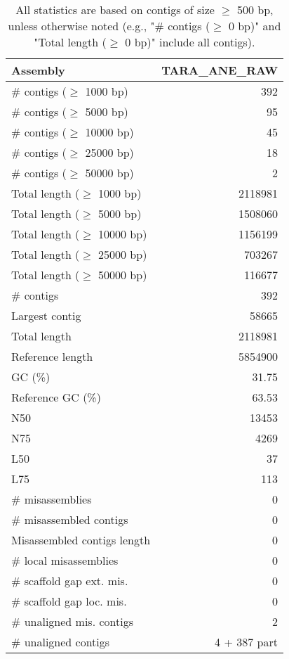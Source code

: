 \documentclass[12pt,a4paper]{article}
\begin{document}
\begin{table}[ht]
\begin{center}
\caption{All statistics are based on contigs of size $\geq$ 500 bp, unless otherwise noted (e.g., "\# contigs ($\geq$ 0 bp)" and "Total length ($\geq$ 0 bp)" include all contigs).}
\begin{tabular}{|l*{1}{|r}|}
\hline
Assembly & TARA\_ANE\_RAW \\ \hline
\# contigs ($\geq$ 1000 bp) & 392 \\ \hline
\# contigs ($\geq$ 5000 bp) & 95 \\ \hline
\# contigs ($\geq$ 10000 bp) & 45 \\ \hline
\# contigs ($\geq$ 25000 bp) & 18 \\ \hline
\# contigs ($\geq$ 50000 bp) & 2 \\ \hline
Total length ($\geq$ 1000 bp) & 2118981 \\ \hline
Total length ($\geq$ 5000 bp) & 1508060 \\ \hline
Total length ($\geq$ 10000 bp) & 1156199 \\ \hline
Total length ($\geq$ 25000 bp) & 703267 \\ \hline
Total length ($\geq$ 50000 bp) & 116677 \\ \hline
\# contigs & 392 \\ \hline
Largest contig & 58665 \\ \hline
Total length & 2118981 \\ \hline
Reference length & 5854900 \\ \hline
GC (\%) & 31.75 \\ \hline
Reference GC (\%) & 63.53 \\ \hline
N50 & 13453 \\ \hline
N75 & 4269 \\ \hline
L50 & 37 \\ \hline
L75 & 113 \\ \hline
\# misassemblies & 0 \\ \hline
\# misassembled contigs & 0 \\ \hline
Misassembled contigs length & 0 \\ \hline
\# local misassemblies & 0 \\ \hline
\# scaffold gap ext. mis. & 0 \\ \hline
\# scaffold gap loc. mis. & 0 \\ \hline
\# unaligned mis. contigs & 2 \\ \hline
\# unaligned contigs & 4 + 387 part \\ \hline

\end{tabular}
\end{center}
\end{table}
\end{document}
